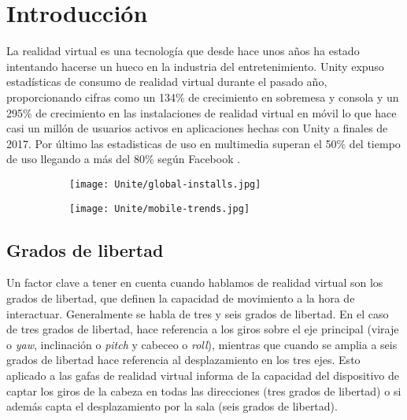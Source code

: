 








\pagestyle{empty}
\chapter{Introducción}
La realidad virtual es una tecnología que desde hace unos años ha estado intentando hacerse un hueco en la industria del entretenimiento. Unity expuso estadísticas de consumo de realidad virtual durante el pasado año, proporcionando cifras como un 134\% de crecimiento en sobremesa y consola y un 295\% de crecimiento en las instalaciones de realidad virtual en móvil lo que hace casi un millón de usuarios activos en aplicaciones hechas con Unity a finales de 2017. Por último las estadisticas de uso en multimedia superan el 50\% del tiempo de uso llegando a más del 80\% según Facebook \cite{FBOculusGo}.

\begin{figure}[h]
\centering
\begin{subfigure}{.5\linewidth}
	\centering
	\texttt{[image: Unite/global-installs.jpg]}
\end{subfigure}%
\begin{subfigure}{.5\linewidth}
	\centering
	\texttt{[image: Unite/mobile-trends.jpg]}
\end{subfigure}
\end{figure}


\section{Grados de libertad}
Un factor clave a tener en cuenta cuando hablamos de realidad virtual son los grados de libertad, que definen la capacidad de movimiento a la hora de interactuar. Generalmente se habla de tres y seis grados de libertad. En el caso de tres grados de libertad, hace referencia a los giros sobre el eje principal (viraje o \textit{yaw}, inclinación o \textit{pitch} y cabeceo o \textit{roll}), mientras que cuando se amplia a seis grados de libertad hace referencia al desplazamiento en los tres ejes. Esto aplicado a las gafas de realidad virtual informa de la capacidad del dispositivo de captar los giros de la cabeza en todas las direcciones (tres grados de libertad) o si además capta el desplazamiento por la sala (seis grados de libertad).

